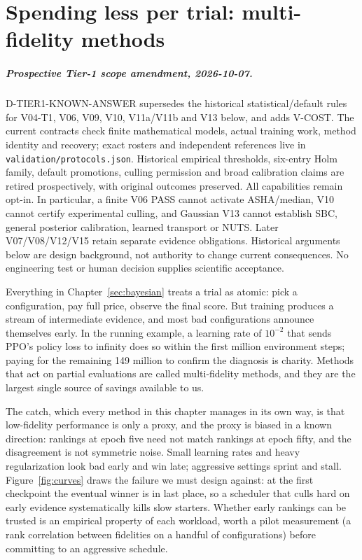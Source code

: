 \chapter{Spending less per trial: multi-fidelity methods}
\label{sec:multifidelity}

\paragraph{Prospective Tier-1 scope amendment, 2026-10-07.}
D-TIER1-KNOWN-ANSWER supersedes the historical statistical/default rules for
V04-T1, V06, V09, V10, V11a/V11b and V13 below, and adds V-COST.
The current contracts check finite mathematical models, actual training work,
method identity and recovery; exact rosters and independent references live in
\texttt{validation/protocols.json}. Historical empirical thresholds, six-entry
Holm family, default promotions, culling permission and broad calibration
claims are retired prospectively, with original outcomes preserved.
All capabilities remain opt-in. In particular, a finite V06 PASS cannot activate
ASHA/median, V10 cannot certify experimental culling, and Gaussian V13 cannot
establish SBC, general posterior calibration, learned transport or NUTS.
Later V07/V08/V12/V15 retain separate evidence obligations. Historical arguments
below are design background, not authority to change current consequences.
No engineering test or human decision supplies scientific acceptance.


Everything in Chapter~\ref{sec:bayesian} treats a trial as atomic: pick a
configuration, pay full price, observe the final score. But training
produces a stream of intermediate evidence, and most bad configurations
announce themselves early. In the running example, a learning rate of
$10^{-2}$ that sends PPO's policy loss to infinity does so within the first
million environment steps; paying for the remaining 149 million to confirm
the diagnosis is charity. Methods that act on partial evaluations are
called multi-fidelity methods, and they are the largest single source of
savings available to us.

The catch, which every method in this chapter manages in its own way, is
that low-fidelity performance is only a proxy, and the proxy is biased in a
known direction: rankings at epoch five need not match rankings at epoch
fifty, and the disagreement is not symmetric noise. Small learning rates
and heavy regularization look bad early and win late; aggressive settings
sprint and stall. Figure~\ref{fig:curves} draws the failure we must
design against: at the first checkpoint the eventual winner is in last
place, so a scheduler that culls hard on early evidence systematically
kills slow starters. Whether early rankings can be trusted is an empirical
property of each workload, worth a pilot measurement (a rank correlation
between fidelities on a handful of configurations) before committing to an
aggressive schedule.

